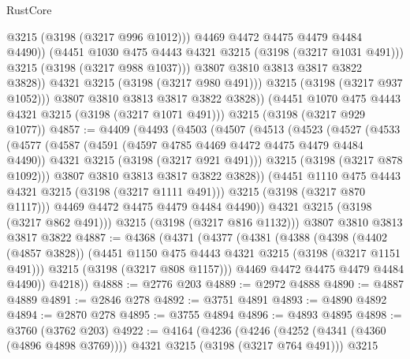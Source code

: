 \begin{lexlean}{RustCore}
\begin{coremodule}
                        @3215
                        (@3198 (@3217 @996 @1012)))
                      @4469
                      @4472
                      @4475
                      @4479
                      @4484
                      @4490))
                  (@4451 @1030 @475 @4443 @4321 @3215 (@3198 (@3217 @1031 @491)))
                  @3215
                  (@3198 (@3217 @988 @1037)))
                @3807
                @3810
                @3813
                @3817
                @3822
                @3828))
            @4321
            @3215
            (@3198 (@3217 @980 @491)))
          @3215
          (@3198 (@3217 @937 @1052)))
        @3807
        @3810
        @3813
        @3817
        @3822
        @3828))
    (@4451 @1070 @475 @4443 @4321 @3215 (@3198 (@3217 @1071 @491)))
    @3215
    (@3198 (@3217 @929 @1077))
@4857 := @4409
    (@4493
      (@4503
        (@4507
          (@4513
            (@4523
              (@4527
                (@4533
                  (@4577
                    (@4587
                      (@4591 (@4597 @4785 @4469 @4472 @4475 @4479 @4484 @4490))
                      @4321
                      @3215
                      (@3198 (@3217 @921 @491)))
                    @3215
                    (@3198 (@3217 @878 @1092)))
                  @3807
                  @3810
                  @3813
                  @3817
                  @3822
                  @3828))
              (@4451 @1110 @475 @4443 @4321 @3215 (@3198 (@3217 @1111 @491)))
              @3215
              (@3198 (@3217 @870 @1117)))
            @4469
            @4472
            @4475
            @4479
            @4484
            @4490))
        @4321
        @3215
        (@3198 (@3217 @862 @491)))
      @3215
      (@3198 (@3217 @816 @1132)))
    @3807
    @3810
    @3813
    @3817
    @3822
@4887 := @4368
    (@4371
      (@4377
        (@4381
          (@4388
            (@4398
              (@4402 (@4857 @3828))
              (@4451 @1150 @475 @4443 @4321 @3215 (@3198 (@3217 @1151 @491)))
              @3215
              (@3198 (@3217 @808 @1157)))
            @4469
            @4472
            @4475
            @4479
            @4484
            @4490))
        @4218))
@4888 := @2776 @203
@4889 := @2972 @4888
@4890 := @4887 @4889
@4891 := @2846 @278
@4892 := @3751 @4891
@4893 := @4890 @4892
@4894 := @2870 @278
@4895 := @3755 @4894
@4896 := @4893 @4895
@4898 := @3760 (@3762 @203)
@4922 := @4164
    (@4236
      (@4246 (@4252 (@4341 (@4360 (@4896 @4898 @3769)))) @4321 @3215 (@3198 (@3217 @764 @491)))
      @3215

\end{coremodule}
\end{lexlean}
